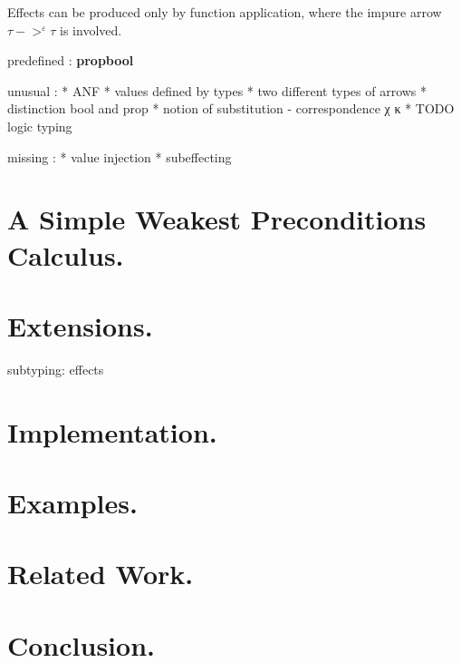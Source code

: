 \documentclass[a4paper]{llncs}
\newcommand{\propml}{{\bf prop}}
\newcommand{\boolml}{{\bf bool}}
\begin{document}
Effects can be produced only by function application, where the impure arrow
$τ->^ετ$ is involved.


predefined : \propml \boolml


unusual : 
* ANF 
* values defined by types
* two different types of arrows
* distinction bool and prop
* notion of substitution - correspondence χ κ
* TODO logic typing

missing : 
* value injection
* subeffecting

\section{A Simple Weakest Preconditions Calculus.}

\section{Extensions.}

subtyping: effects

\section{Implementation.}

\section{Examples.}

\section{Related Work.}

\section{Conclusion.}
\end{document}
